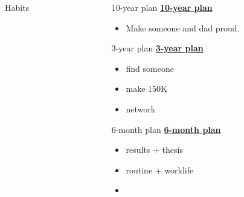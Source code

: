 \begin{columns}
\begin{column}{0.333\columnwidth}
\begin{columns}
\begin{column}{0.22\linewidth}
\begin{block}{Habits}
\ifdefined\POSTER
    \end{block} 
  \end{column} %
\fi

\ifdefined\POSTER
  \begin{column}{0.5\linewidth}
    \begin{block}{10-year plan}   %
\else 
 \underline{\bf 10-year plan}

\fi
      \begin{itemize}
      \item \small Make someone and dad proud.
      \end{itemize}
\ifdefined\POSTER
    \end{block}
\fi

\ifdefined\POSTER 
    \begin{block}{3-year plan}
\else
\underline{\bf 3-year plan} 
\fi
      \begin{itemize}
      \item \small find someone
      \item \small make 150K
      \item \small network
      \end{itemize}
\ifdefined\POSTER
    \end{block} 
\fi


\ifdefined\POSTER
    \begin{block}{6-month plan}
\else 
\underline{\bf 6-month plan}
\fi
      \begin{itemize}
        \small \item \small results + thesis
      \item \small routine + worklife
      \item \small 
      \end{itemize}
\ifdefined\POSTER
    \end{block} 
\fi


\end{column}
\end{columns}
\end{column}
\end{columns}
